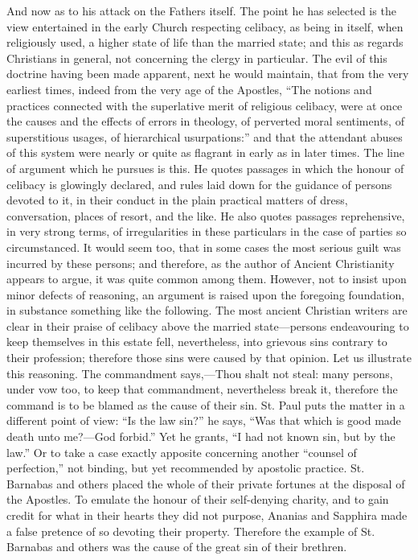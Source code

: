 And now as to his attack on the Fathers itself. The
point he has selected is the view entertained in the early Church
respecting celibacy, as being in itself, when religiously used, a higher
state of life than the married state; and this as regards Christians in
general, not concerning the clergy in particular. The evil of this
doctrine having been made apparent, next he would maintain, that from
the very earliest times, indeed from the very age of the Apostles, ``The
notions and practices connected with the superlative merit of religious
celibacy, were at once the causes and the effects of errors in theology,
of perverted moral sentiments, of superstitious usages, of hierarchical
usurpations:'' and that the attendant abuses of this system were nearly
or quite as flagrant in early as in later times. The line of argument
which he pursues is this. He quotes passages in which the honour of
celibacy is glowingly declared, and rules laid down for the guidance of
persons devoted to it, in their conduct in the plain practical matters
of dress, conversation, places of resort, and the like. He also quotes
passages reprehensive, in very strong terms, of irregularities in these
particulars in the case of parties so circumstanced. It would seem too,
that in some cases the most serious guilt was incurred by these persons;
and therefore, as the author of Ancient Christianity appears to argue,
it was quite common among them. However, not to insist upon minor
defects of reasoning, an argument is raised upon the foregoing
foundation, in substance something like the following. The most ancient
Christian writers are clear in their praise of celibacy above the
married state—persons endeavouring to keep themselves in this estate
fell, nevertheless, into grievous sins contrary to their profession;
therefore those sins were caused by that opinion. Let us illustrate this
reasoning. The commandment says,—Thou shalt not steal: many persons,
under vow too, to keep that commandment, nevertheless break it,
therefore the command is to be blamed as the cause of their sin. St.
Paul puts the matter in a different point of view: ``Is the law sin?'' he
says, ``Was that which is good made death unto me?—God forbid.'' Yet he
grants, ``I had not known sin, but by the law.'' Or to take a case exactly
apposite concerning another ``counsel of perfection,'' not binding, but
yet recommended by apostolic practice. St. Barnabas and others placed
the whole of their private fortunes at the disposal of the Apostles. To
emulate the honour of their self-denying charity, and to gain credit for
what in their hearts they did not purpose, Ananias and Sapphira made a
false pretence of so devoting their property. Therefore the example of St. Barnabas and others was the cause of the great sin of
their brethren.

